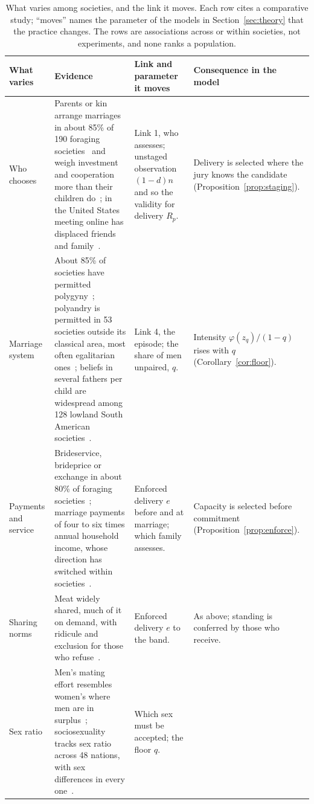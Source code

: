 \begin{table}[t]
\caption{What varies among societies, and the link it moves. Each row cites a comparative study; ``moves'' names the
parameter of the models in Section~\ref{sec:theory} that the practice changes. The rows are associations across or within
societies, not experiments, and none ranks a population.}
\label{tab:culture}
\scriptsize
\begin{tabularx}{\textwidth}{@{}P{0.13\textwidth}LP{0.25\textwidth}P{0.17\textwidth}@{}}
\toprule
What varies & Evidence & Link and parameter it moves & Consequence in the model\\
\midrule
Who chooses &
Parents or kin arrange marriages in about 85\% of 190 foraging societies~\cite{walker2011,apostolou2007} and weigh investment
and cooperation more than their children do~\cite{buunk2008}; in the United States meeting online has displaced friends and
family~\cite{rosenfeld2019}. &
Link 1, who assesses; unstaged observation $(1-d)n$ and so the validity for delivery $R_p$. &
Delivery is selected where the jury knows the candidate (Proposition~\ref{prop:staging}).\\
Marriage system &
About 85\% of societies have permitted polygyny~\cite{henrich2012}; polyandry is permitted in 53 societies outside its classical area, most often egalitarian
ones~\cite{starkweather2012}; beliefs in several fathers per child are widespread among 128 lowland South American
societies~\cite{walker2010}. &
Link 4, the episode; the share of men unpaired, $q$. &
Intensity $\varphi(z_q)/(1-q)$ rises with $q$ (Corollary~\ref{cor:floor}).\\
Payments and service &
Brideservice, brideprice or exchange in about 80\% of foraging societies~\cite{walker2011}; marriage payments of four to six
times annual household income, whose direction has switched within societies~\cite{anderson2007}. &
Enforced delivery $e$ before and at marriage; which family assesses. &
Capacity is selected before commitment (Proposition~\ref{prop:enforce}).\\
Sharing norms &
Meat widely shared, much of it on demand, with ridicule and exclusion for those who
refuse~\cite{woodburn1982,peterson1993,wiessner2005}. &
Enforced delivery $e$ to the band. &
As above; standing is conferred by those who receive.\\
Sex ratio &
Men's mating effort resembles women's where men are in surplus~\cite{schacht2015}; sociosexuality tracks sex ratio across 48
nations, with sex differences in every one~\cite{schmitt2005}. &
Which sex must be accepted; the floor $q$. &

\end{tabularx}
\end{table}
